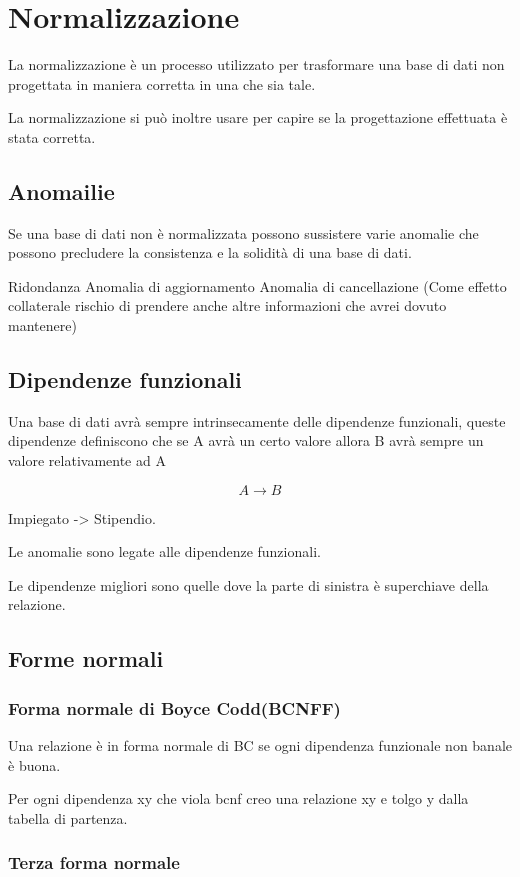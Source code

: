\chapter{Normalizzazione}

La normalizzazione è un processo utilizzato per trasformare una base di dati non progettata in maniera corretta in una che sia tale.

La normalizzazione si può inoltre usare per capire se la progettazione effettuata è stata corretta.

\section{Anomailie}

Se una base di dati non è normalizzata possono sussistere varie anomalie che possono precludere la consistenza e la solidità di una base di dati.

Ridondanza
Anomalia di aggiornamento
Anomalia di cancellazione
(Come effetto collaterale rischio di prendere anche altre informazioni che avrei dovuto mantenere)

\section{Dipendenze funzionali}

Una base di dati avrà sempre intrinsecamente delle dipendenze funzionali, queste dipendenze definiscono che se A avrà un certo valore allora B avrà sempre un valore relativamente ad A

\[ A \rightarrow B\]

Impiegato -> Stipendio.

Le anomalie sono legate alle dipendenze funzionali.

Le dipendenze migliori sono quelle dove la parte di sinistra è superchiave della relazione.

\section{Forme normali}
\subsection{Forma normale di Boyce Codd(BCNFF)}

Una relazione è in forma normale di BC se ogni dipendenza funzionale non banale è buona.

Per ogni dipendenza xy che viola bcnf creo una relazione xy e tolgo y dalla tabella di partenza.

\subsection{Terza forma normale}
